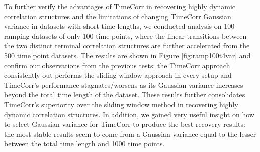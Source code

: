 \documentclass[11pt]{article}
\begin{document}
To further verify the advantages of TimeCorr in recovering highly dynamic correlation structures and the limitations of changing TimeCorr Gaussian variance in datasets with short time lengths, we conducted analysis on 100 ramping datasets of only 100 time points, where the linear transitions between the two distinct terminal correlation structures are further accelerated from the 500 time point datasets. The results are shown in Figure \ref{fig:ramp100t4var} and confirm our observations from the previous tests: the TimeCorr approach consistently out-performs the sliding window approach in every setup and TimeCorr's performance stagnates/worsens as its Gaussian variance increases beyond the total time length of the dataset. These results further consolidates TimeCorr's superiority over the sliding window method in recovering highly dynamic correlation structures. In addition, we gained very useful insight on how to select Gaussian variance for TimeCorr to produce the best recovery results: the most stable results seem to come from a Gaussian variance equal to the lesser between the total time length and 1000 time points.
\end{document}
